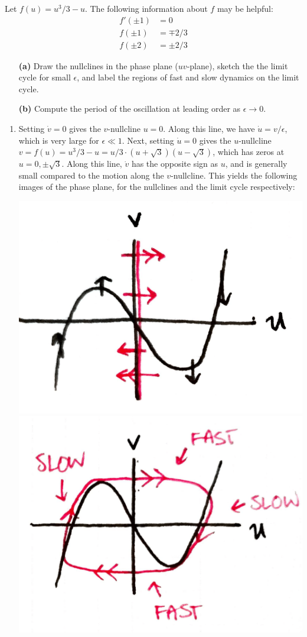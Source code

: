 \documentclass[10pt,letterpaper]{report}
\begin{document}
\begin{enumerate}
\begin{qbox}
Let $f(u) = u^3 /3 - u$. The following information about $f$ may be helpful:
\begin{align*}
    f'(\pm 1) &= 0 \\
    f(\pm 1) &= \mp 2/3 \\
    f(\pm 2) &= \pm 2/3
\end{align*}
\begin{itemize}
\item[\textbf{(a)}] Draw the nullclines in the phase plane ($uv$-plane), sketch the the limit cycle for small $\epsilon$, and label the regions of fast and slow dynamics on the limit cycle.
\item[\textbf{(b)}] Compute the period of the oscillation at leading order as $\epsilon \to 0$.
\end{itemize}
\end{qbox}

\begin{enumerate}
    \item Setting $\dot v = 0$ gives the $v$-nullcline $u = 0$. Along this line, we have $\dot u = v/\epsilon$, which is very large for $\epsilon \ll 1$. Next, setting $\dot u = 0$ gives the $u$-nullcline $v = f(u) = u^3/3 - u = u/3 \cdot (u + \sqrt 3)(u - \sqrt 3)$, which has zeros at $u = 0, \pm \sqrt 3$. Along this line, $\dot v$ has the opposite sign as $u$, and is generally small compared to the motion along the $v$-nullcline. This yields the following images of the phase plane, for the nullclines and the limit cycle respectively:
    
    \begin{center}
    \includegraphics[height=0.3\textwidth]{img/2019S6a1.png} \qquad 
    \includegraphics[height=0.3\textwidth]{img/2019S6a2.png}
    \end{center}
    
\end{enumerate}

\end{enumerate}
\end{document}
